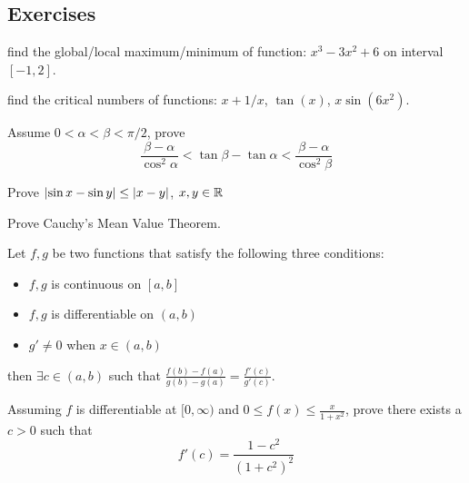 \documentclass[Calculus 1 Recitation.tex]{subfiles}
\begin{document}
\subsection{Exercises}

\begin{myleftlinebox}
	find the global/local maximum/minimum of function: $x^3-3x^2+6$ on interval $[-1,2]$.
	\tcblower
	\vspace{2em}	
\end{myleftlinebox}

\begin{myleftlinebox}
	find the critical numbers of functions: $x+1/x$, $\tan(x)$, $x\sin(6x^2)$.
	\tcblower
	\vspace{2em}	
\end{myleftlinebox}

\begin{myleftlinebox}
	Assume $0<\alpha<\beta<\pi/2$, prove 
	\[\frac{\beta-\alpha}{\cos^2\alpha}<\tan\beta-\tan\alpha<\frac{\beta-\alpha}{\cos^2\beta}\]
	\tcblower
	\vspace{3em}	
\end{myleftlinebox}

\begin{myleftlinebox}
	Prove $\left\vert\sin x-\sin y\right\vert \leq \left\vert x-y\right\vert$, $x,y\in\mathbb{R}$
	\tcblower
	\vspace{3em}	
\end{myleftlinebox}

\begin{myleftlinebox}
	Prove Cauchy's Mean Value Theorem. 
	\begin{theorem}
		Let $f,g$ be two functions that satisfy the following three conditions:
		\begin{itemize}
			\item $f,g$ is continuous on $[a,b]$
			\item $f,g$ is differentiable on $(a,b)$
			\item $g'\neq0$ when $x\in(a,b)$
		\end{itemize}
		then $\exists c\in(a,b)$ such that $\frac{f(b)-f(a)}{g(b)-g(a)}=\frac{f'(c)}{g'(c)}$.
	\end{theorem}
	\tcblower
	\vspace{3em}	
\end{myleftlinebox}

\begin{myleftlinebox}
	Assuming $f$ is differentiable at $[0,\infty)$ and $0\leq f(x)\leq \frac{x}{1+x^2}$, prove there exists a $c>0$ such that
	\[f'(c)=\frac{1-c^2}{(1+c^2)^2}\]
	\tcblower
	\vspace{3em}
\end{myleftlinebox}
\end{document}
